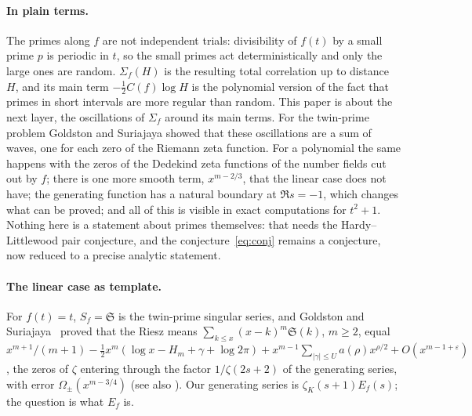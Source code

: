 \documentclass[11pt,a4paper]{article}
\theoremstyle{remark}\newtheorem{remark}[theorem]{Remark}
\newcommand{\Sig}{\mathfrak S}\newcommand{\Off}{\mathrm{Off}}\newcommand{\Frob}{\operatorname{Frob}}
\begin{document}
\paragraph{In plain terms.} The primes along $f$ are not independent trials: divisibility of $f(t)$ by a
small prime $p$ is periodic in $t$, so the small primes act deterministically and only the large ones are
random. $\Sigma_f(H)$ is the resulting total correlation up to distance $H$, and its main term
$-\tfrac12C(f)\log H$ is the polynomial version of the fact that primes in short intervals are more regular
than random. This paper is about the next layer, the oscillations of $\Sigma_f$ around its main terms. For
the twin-prime problem Goldston and Suriajaya showed that these oscillations are a sum of waves, one for
each zero of the Riemann zeta function. For a polynomial the same happens with the zeros of the Dedekind
zeta functions of the number fields cut out by $f$; there is one more smooth term, $x^{m-2/3}$, that the
linear case does not have; the generating function has a natural boundary at $\Re s=-1$, which changes what
can be proved; and all of this is visible in exact computations for $t^2+1$. Nothing here is a statement
about primes themselves: that needs the Hardy--Littlewood pair conjecture, and the conjecture~\eqref{eq:conj}
remains a conjecture, now reduced to a precise analytic statement.

\paragraph{The linear case as template.} For $f(t)=t$, $S_f=\Sig$ is the twin-prime singular series, and
Goldston and Suriajaya~\cite{GoldstonSuriajaya2021} proved that the Riesz means $\sum_{k\le x}(x-k)^m\Sig(k)$,
$m\ge2$, equal $x^{m+1}/(m+1)-\tfrac12x^m(\log x-H_m+\gamma+\log2\pi)+x^{m-1}\sum_{|\gamma|\le U}a(\rho)x^{\rho/2}+O(x^{m-1+\varepsilon})$,
the zeros of $\zeta$ entering through the factor $1/\zeta(2s+2)$ of the generating series, with error
$\Omega_\pm(x^{m-3/4})$ (see also \cite{GoldstonSuriajaya2021b,Vaughan2001,FriedlanderGoldston1995}). Our
generating series is $\zeta_K(s+1)E_f(s)$; the question is what $E_f$ is.
\end{document}
